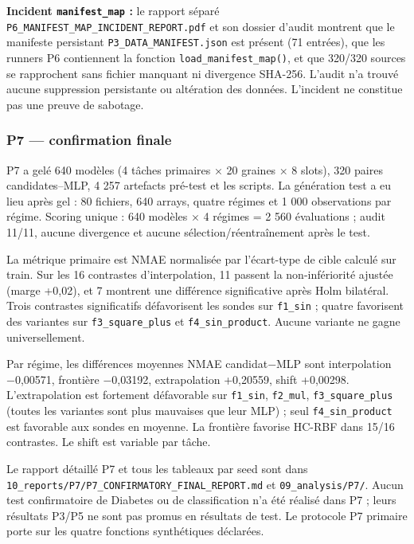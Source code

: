 \documentclass[
]{article}
\begin{document}
\textbf{Incident \texttt{manifest\_map} :} le rapport séparé
\texttt{P6\_MANIFEST\_MAP\_INCIDENT\_REPORT.pdf} et son dossier d'audit
montrent que le manifeste persistant \texttt{P3\_DATA\_MANIFEST.json}
est présent (71 entrées), que les runners P6 contiennent la fonction
\texttt{load\_manifest\_map()}, et que 320/320 sources se rapprochent
sans fichier manquant ni divergence SHA-256. L'audit n'a trouvé aucune
suppression persistante ou altération des données. L'incident ne
constitue pas une preuve de sabotage.

\subsubsection{P7 --- confirmation finale}\label{p7-confirmation-finale}

P7 a gelé 640 modèles (4 tâches primaires × 20 graines × 8 slots), 320
paires candidates--MLP, 4 257 artefacts pré-test et les scripts. La
génération test a eu lieu après gel : 80 fichiers, 640 arrays, quatre
régimes et 1 000 observations par régime. Scoring unique : 640 modèles ×
4 régimes = 2 560 évaluations ; audit 11/11, aucune divergence et aucune
sélection/réentraînement après le test.

La métrique primaire est NMAE normalisée par l'écart-type de cible
calculé sur train. Sur les 16 contrastes d'interpolation, 11 passent la
non-infériorité ajustée (marge +0,02), et 7 montrent une différence
significative après Holm bilatéral. Trois contrastes significatifs
défavorisent les sondes sur \texttt{f1\_sin} ; quatre favorisent des
variantes sur \texttt{f3\_square\_plus} et \texttt{f4\_sin\_product}.
Aucune variante ne gagne universellement.

Par régime, les différences moyennes NMAE candidat−MLP sont
interpolation −0,00571, frontière −0,03192, extrapolation +0,20559,
shift +0,00298. L'extrapolation est fortement défavorable sur
\texttt{f1\_sin}, \texttt{f2\_mul}, \texttt{f3\_square\_plus} (toutes
les variantes sont plus mauvaises que leur MLP) ; seul
\texttt{f4\_sin\_product} est favorable aux sondes en moyenne. La
frontière favorise HC-RBF dans 15/16 contrastes. Le shift est variable
par tâche.

Le rapport détaillé P7 et tous les tableaux par seed sont dans
\texttt{10\_reports/P7/P7\_CONFIRMATORY\_FINAL\_REPORT.md} et
\texttt{09\_analysis/P7/}. Aucun test confirmatoire de Diabetes ou de
classification n'a été réalisé dans P7 ; leurs résultats P3/P5 ne sont
pas promus en résultats de test. Le protocole P7 primaire porte sur les
quatre fonctions synthétiques déclarées.
\end{document}
